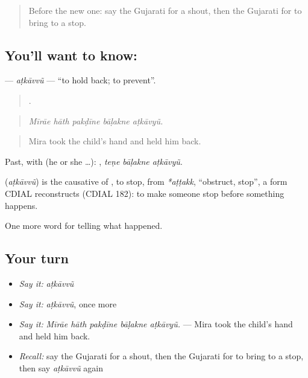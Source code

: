 \label{lesson:GU-C299-atkavvu}



\begin{quote}
Before the new one: say the Gujarati for a shout, then the Gujarati for to bring to a stop.
\end{quote}

\subsection*{You'll want to know: }
\textbf{} — \emph{aṭkāvvũ} — \textquotedblleft{}to hold back; to prevent\textquotedblright{}.

\begin{quote}
    .
\end{quote}

\begin{quote}
\emph{Mīrāe hāth pakḍīne bāḷakne aṭkāvyũ.}
\end{quote}

\begin{quote}
Mira took the child's hand and held him back.
\end{quote}

Past, with  (he or she …):   , \emph{teṇe bāḷakne aṭkāvyũ}.

\begin{cousinweb}
\textbf{} (\emph{aṭkāvvũ}) is the causative of \textbf{}, to stop, from \emph{*aṭṭakk}, \textquotedblleft{}obstruct, stop\textquotedblright{}, a form CDIAL reconstructs (CDIAL 182): to make someone stop before something happens.
\end{cousinweb}

\begin{grammarlens}[title={What you've built}]
One more word for telling what happened.
\end{grammarlens}

\subsection*{Your turn}
\begin{itemize}
\raggedright
  \item \emph{Say it:} \emph{aṭkāvvũ}
  \item \emph{Say it:} \emph{aṭkāvvũ}, once more
  \item \emph{Say it:} \emph{Mīrāe hāth pakḍīne bāḷakne aṭkāvyũ.} — Mira took the child's hand and held him back.
  \item \emph{Recall:} say the Gujarati for a shout, then the Gujarati for to bring to a stop, then say \emph{aṭkāvvũ} again
\end{itemize}

